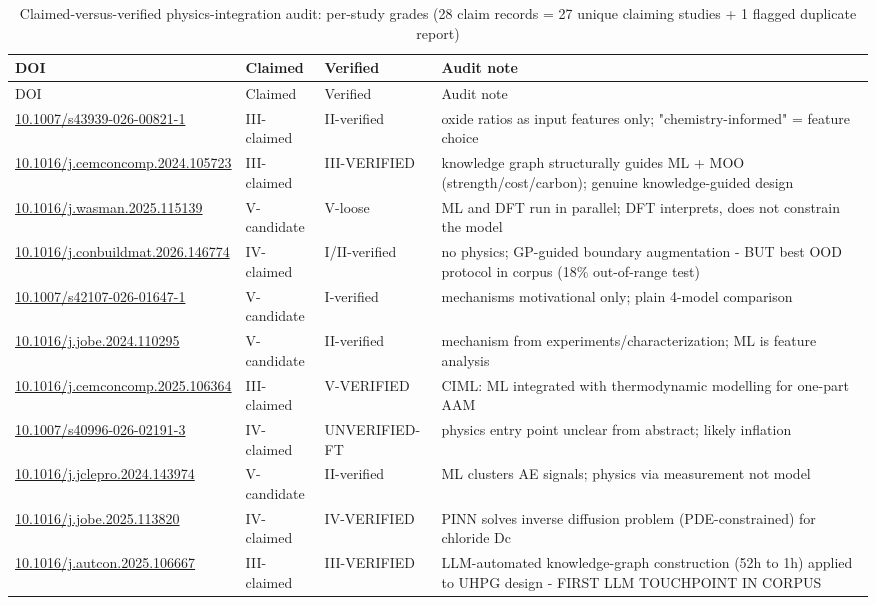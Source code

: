 \documentclass[pdflatex,sn-basic]{sn-jnl}
\begin{document}
{\footnotesize
\begin{longtable}{p{}p{}p{}p{}}
\caption{Claimed-versus-verified physics-integration audit: per-study grades (28 claim records = 27 unique claiming studies + 1 flagged duplicate report)}\\
\toprule
DOI & Claimed & Verified & Audit note \\
\midrule
\endfirsthead
\toprule
DOI & Claimed & Verified & Audit note \\
\midrule
\endhead
\bottomrule
\endfoot
\url{10.1007/s43939-026-00821-1} & III-claimed & II-verified & oxide ratios as input features only; "chemistry-informed" = feature choice \\
\url{10.1016/j.cemconcomp.2024.105723} & III-claimed & III-VERIFIED & knowledge graph structurally guides ML + MOO (strength/cost/carbon); genuine knowledge-guided design \\
\url{10.1016/j.wasman.2025.115139} & V-candidate & V-loose & ML and DFT run in parallel; DFT interprets, does not constrain the model \\
\url{10.1016/j.conbuildmat.2026.146774} & IV-claimed & I/II-verified & no physics; GP-guided boundary augmentation - BUT best OOD protocol in corpus (18\% out-of-range test) \\
\url{10.1007/s42107-026-01647-1} & V-candidate & I-verified & mechanisms motivational only; plain 4-model comparison \\
\url{10.1016/j.jobe.2024.110295} & V-candidate & II-verified & mechanism from experiments/characterization; ML is feature analysis \\
\url{10.1016/j.cemconcomp.2025.106364} & III-claimed & V-VERIFIED & CIML: ML integrated with thermodynamic modelling for one-part AAM \\
\url{10.1007/s40996-026-02191-3} & IV-claimed & UNVERIFIED-FT & physics entry point unclear from abstract; likely inflation \\
\url{10.1016/j.jclepro.2024.143974} & V-candidate & II-verified & ML clusters AE signals; physics via measurement not model \\
\url{10.1016/j.jobe.2025.113820} & IV-claimed & IV-VERIFIED & PINN solves inverse diffusion problem (PDE-constrained) for chloride Dc \\
\url{10.1016/j.autcon.2025.106667} & III-claimed & III-VERIFIED & LLM-automated knowledge-graph construction (52h to 1h) applied to UHPG design - FIRST LLM TOUCHPOINT IN CORPUS \\

\end{longtable}}
\end{document}
